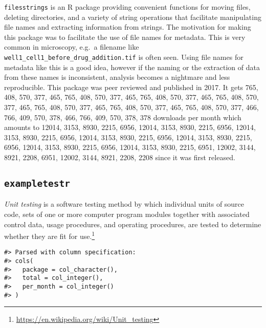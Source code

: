 \documentclass[12pt,]{book}
\let\rmarkdownfootnote\footnote%
\def\footnote{\protect\rmarkdownfootnote}
\theoremstyle{definition}
\theoremstyle{definition}
\theoremstyle{definition}
\theoremstyle{remark}
\let\BeginKnitrBlock\begin \let\EndKnitrBlock\end
\begin{document}
\texttt{filesstrings} is an R package providing convenient functions for
moving files, deleting directories, and a variety of string operations
that facilitate manipulating file names and extracting information from
strings. The motivation for making this package was to facilitate the
use of file names for metadata. This is very common in microscopy,
e.g.~a filename like \texttt{well1\_cell1\_before\_drug\_addition.tif}
is often seen. Using file names for metadata like this is a good idea,
however if the naming or the extraction of data from these names is
inconsistent, analysis becomes a nightmare and less reproducible. This
package was peer reviewed and published in 2017.\citep{filesstrings} It
gets 765, 408, 570, 377, 465, 765, 408, 570, 377, 465, 765, 408, 570,
377, 465, 765, 408, 570, 377, 465, 765, 408, 570, 377, 465, 765, 408,
570, 377, 465, 765, 408, 570, 377, 466, 766, 409, 570, 378, 466, 766,
409, 570, 378, 378 downloads per month which amounts to 12014, 3153,
8930, 2215, 6956, 12014, 3153, 8930, 2215, 6956, 12014, 3153, 8930,
2215, 6956, 12014, 3153, 8930, 2215, 6956, 12014, 3153, 8930, 2215,
6956, 12014, 3153, 8930, 2215, 6956, 12014, 3153, 8930, 2215, 6951,
12002, 3144, 8921, 2208, 6951, 12002, 3144, 8921, 2208, 2208 since it
was first released.

\subsection{\texorpdfstring{\texttt{exampletestr}}{exampletestr}}\label{exampletestr}

\BeginKnitrBlock{definition}
\protect\hypertarget{def:unnamed-chunk-19}{}{\label{def:unnamed-chunk-19}
}\emph{Unit testing} is a software testing method by which individual
units of source code, sets of one or more computer program modules
together with associated control data, usage procedures, and operating
procedures, are tested to determine whether they are fit for
use.\footnote{\url{https://en.wikipedia.org/wiki/Unit_testing}}
\EndKnitrBlock{definition}

\begin{verbatim}
#> Parsed with column specification:
#> cols(
#>   package = col_character(),
#>   total = col_integer(),
#>   per_month = col_integer()
#> )
\end{verbatim}
\end{document}
